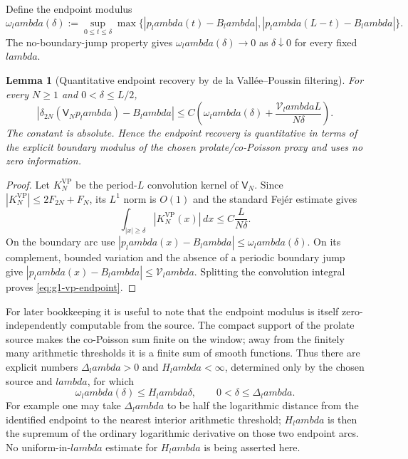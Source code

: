 \documentclass[11pt]{article}
\def\lambda{lambda}%
\newtheorem{lemma}[theorem]{Lemma}
\theoremstyle{remark}
\begin{document}
Define the endpoint modulus
\begin{equation}\label{eq:g1-edge-modulus}
 \omega_\lambda(\delta)
 :=\sup_{0\le t\le\delta}
 \max\{|p_\lambda(t)-B_\lambda|,
       |p_\lambda(L-t)-B_\lambda|\}.
\end{equation}
The no-boundary-jump property gives $\omega_\lambda(\delta)\to0$ as
$\delta\downarrow0$ for every fixed $\lambda$.

\begin{lemma}[Quantitative endpoint recovery by de la Vall\'ee--Poussin filtering]\label{lem:g1-vp-endpoint}
For every $N\ge1$ and $0<\delta\le L/2$,
\begin{equation}\label{eq:g1-vp-endpoint}
 \boxed{
 |\delta_{2N}(\mathsf V_Np_\lambda)-B_\lambda|
 \le C\left(
  \omega_\lambda(\delta)
  +\frac{\mathcal V_\lambda L}{N\delta}
 \right).}
\end{equation}
The constant is absolute.  Hence the endpoint recovery is quantitative in
terms of the explicit boundary modulus of the chosen prolate/co-Poisson
proxy and uses no zero information.
\end{lemma}
\begin{proof}
Let $K_N^{\mathrm{VP}}$ be the period-$L$ convolution kernel of
$\mathsf V_N$.  Since
$|K_N^{\mathrm{VP}}|\le2F_{2N}+F_N$, its $L^1$ norm is $O(1)$ and the
standard Fej\'er estimate gives
\[
 \int_{|x|\ge\delta}|K_N^{\mathrm{VP}}(x)|\,dx
 \le C\frac{L}{N\delta}.
\]
On the boundary arc use
$|p_\lambda(x)-B_\lambda|\le\omega_\lambda(\delta)$.  On its complement,
bounded variation and the absence of a periodic boundary jump give
$|p_\lambda(x)-B_\lambda|\le\mathcal V_\lambda$.  Splitting the convolution
integral proves \eqref{eq:g1-vp-endpoint}.
\end{proof}

For later bookkeeping it is useful to note that the endpoint modulus is itself
zero-independently computable from the source.  The compact support of the
prolate source makes the co-Poisson sum finite on the window; away from the
finitely many arithmetic thresholds it is a finite sum of smooth functions.
Thus there are explicit numbers $\Delta_\lambda>0$ and $H_\lambda<\infty$,
determined only by the chosen source and $\lambda$, for which
\begin{equation}\label{eq:g1-edge-lipschitz}
 \omega_\lambda(\delta)\le H_\lambda\delta,
 \qquad0<\delta\le\Delta_\lambda.
\end{equation}
For example one may take $\Delta_\lambda$ to be half the logarithmic distance
from the identified endpoint to the nearest interior arithmetic threshold;
$H_\lambda$ is then the supremum of the ordinary logarithmic derivative on
those two endpoint arcs.  No uniform-in-$\lambda$ estimate for $H_\lambda$ is
being asserted here.
\end{document}
